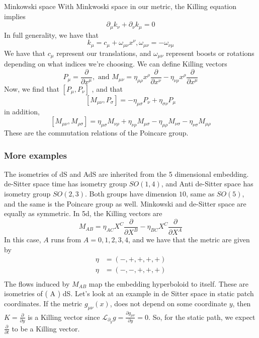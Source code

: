 \begin{example}{Minkowski space} 
With Minkwoski space in our metric, 
the Killing equation implies 
\[
 \partial _ \mu k _ \nu + \partial  _ \nu k _ \mu  = 0
\] In full generality, we have that 
\[
	k _{ \mu }  = c_\mu + \omega _{ \mu \nu } x ^ \nu , \omega_{ \mu \nu }  =- \omega  _{  \nu \mu }
\] We have that $ c _ \mu $ represent our translations, 
and $ \omega_{ \mu \nu } $ represent boosts or rotations 
depending on what indices we're choosing. 
We can define Killing vectors 
\[
 P _ \mu  = \frac{\partial   }{ \partial  x ^ \mu } , \text{ and } M_{ \mu \nu } 
  = \eta _{ \mu \rho } x ^ \rho \frac{\partial  }{\partial  x ^ \nu }   - \eta _{ \nu \rho } x ^ \rho \frac{\partial  }{\partial  x ^ \mu } 
\] Now, we find that $ [ P_\mu, P _ \nu  ]  $ , and that 
\[
	[ M_{ \mu \nu }, P _ \sigma ] =  - \eta _{ \mu \sigma } P _ \nu + \eta_{ \sigma \nu } P_{ \mu } 
\] in addition, 
\[
	[ M_{ \mu \nu } , M_{ \rho \sigma  } ] = \eta_{ \mu \sigma } M_{ \nu \rho } + \eta_{ \nu \rho } M_{ \mu \sigma } 
	 - \eta_{ \mu \rho } M_{ \nu \sigma } - \eta_{ \nu \sigma } M_{ \mu \rho }
\] These are the commutation relations of the Poincare group. 	
\end{example}

\subsubsection{More examples} 
The isometries of dS and AdS are inherited from 
the 5 dimensional embedding. 
de-Sitter space time has isometry group $ SO ( 1, 4 ) $, 
and Anti de-Sitter space has isometry group $ SO ( 2, 3 ) $. 
Both groups have dimension  $ 10 $, same as 
$ SO ( 5 ) $, and the same is the Poincare group as well.
Minkowski and de-Sitter space are equally as symmetric.
In 5d, the Killing vectors are 
\[
 M_{ AB }  = \eta_{ AC } X ^ C \frac{\partial  }{\partial  X ^ B } - 
 \eta _{ B C} X ^ C \frac{\partial   }{\partial  X ^ A } 
\] In this case, $ A $ runs from $ A  = 0 , 1, 2, 3, 4$, 
and we have that the metric are given by 
 \begin{align*}
	 \eta &=  ( - , + , + , + , + )  \\
	 \eta &=  (- , -, + , + , + )  \\
 \end{align*} 
 The flows induced by $ M_{AB } $ map the embedding 
 hyperboloid to itself. These are isometries of 
 ( A ) dS. 
 Let's look at an example in de Sitter space in static patch coordinates. 
 If the metric $ g_{ \mu \nu } ( x) $, does not 
 depend on some coordinate $ y $, then $ K = \frac{\partial }{\partial y } $ 
 is a Killing vector since $ \mathcal{ L }_{ \partial  _ y } g   = 
 \frac{ \partial  g_{ \mu \nu } }{ \partial  y }  = 0 $. 
 So, for the static path, we expect $ \frac{\partial  }{\partial  t }  $ 
 to be a Killing vector.

